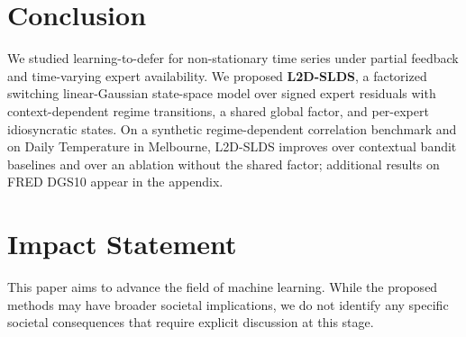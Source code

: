 \section{Conclusion}
We studied learning-to-defer for non-stationary time series under partial feedback and
time-varying expert availability. We proposed \textbf{L2D-SLDS}, a factorized switching
linear-Gaussian state-space model over signed expert residuals with context-dependent regime
transitions, a shared global factor, and per-expert idiosyncratic states. On a synthetic regime-dependent correlation benchmark and on Daily Temperature in Melbourne, L2D-SLDS improves over contextual
bandit baselines and over an ablation without the shared factor; additional results on FRED DGS10
appear in the appendix.


\section{Impact Statement}
This paper aims to advance the field of machine learning. While the proposed methods may have broader societal implications, we do not identify any specific societal consequences that require explicit discussion at this stage.
